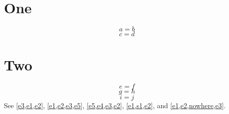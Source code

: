 \documentclass{article}
\begin{document}
\section{One}\label{s1}
\begin{equation}\label{e1}
a = b
\end{equation}
\begin{equation}\label{e2}
c = d
\end{equation}
\section{Two}\label{s2}
\begin{equation}\label{e3}
e = f
\end{equation}
\begin{equation}\label{e4}
g = h
\end{equation}
\begin{equation}\label{e5}
i = j
\end{equation}
See \cref{e3,e1,e2}, \cref{e1,e2,e3,e5}, \cref{e5,e4,e3,e2}, \cref{e1,s1,e2},  and \cref{e1,e2,nowhere,e3}.
\end{document}
